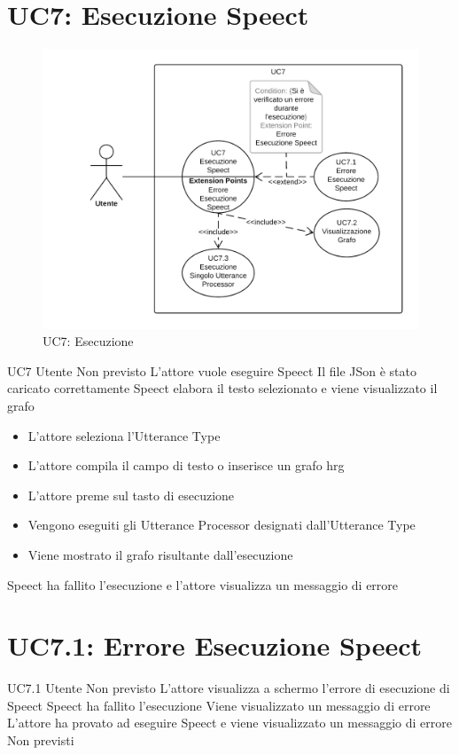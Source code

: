 \documentclass[../AnalisideiRequisiti.tex]{subfiles}
\begin{document}
\section{UC7: Esecuzione Speect}
\begin{figure}[H]
	\centering
	\includegraphics[width=\textwidth]{../img/UC7.png}
	\caption{UC7: Esecuzione}
\end{figure}
\UserCase
{UC7}
{Utente}
{Non previsto}
{L'attore vuole eseguire Speect}
{Il file JSon è stato caricato correttamente }
{Speect elabora il testo selezionato e viene visualizzato il grafo}
{\begin{itemize}
		\item{} L'attore seleziona l'Utterance Type 
		\item{} L'attore compila il campo di testo o inserisce un grafo hrg
		\item{} L'attore preme sul tasto di esecuzione
		\item{} Vengono eseguiti gli Utterance Processor designati dall'Utterance Type 
		\item{} Viene mostrato il grafo risultante dall'esecuzione 
	\end{itemize}
}
{Speect ha fallito l'esecuzione e l'attore visualizza un messaggio di errore }

\section{UC7.1: Errore Esecuzione Speect}
\UserCase
{UC7.1}
{Utente}
{Non previsto}
{L'attore visualizza a schermo l'errore di esecuzione di Speect}
{Speect ha fallito l'esecuzione}
{Viene visualizzato un messaggio di errore}
{L'attore ha provato ad eseguire Speect e viene visualizzato un messaggio di errore}
{Non previsti}
\end{document}
